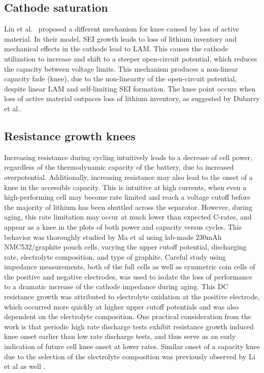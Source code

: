 \documentclass[journal=jpcl, manuscript=article, layout=onecolumn]{achemso}
\newcommand{\pbox}[1]{{
\fbox{
\parbox{0.8\textwidth}{  \fbox{$\triangleright$\textcolor{blue}{\textbf{From Peter}:}} 
#1
}}}}
\begin{document}
\subsection{Cathode saturation}

\pbox{Tino: Let's work on this section together}

Lin et al.~\cite{lin_comprehensive_2013} proposed a different mechanism for knee caused by loss of active material. In their model, SEI growth leads to loss of lithium inventory and mechanical effects in the cathode lead to LAM. This causes the cathode utilization to increase and shift to a steeper open-circuit potential, which reduces the capacity between voltage limits. This mechanism produces a non-linear capacity fade (knee), due to the non-linearity of the open-circuit potential, despite linear LAM and self-limiting SEI formation. The knee point occurs when loss of active material outpaces loss of lithium inventory, as suggested by Dubarry et al.\cite{dubarry_durability_2018}.

\subsection{Resistance growth knees}

Increasing resistance during cycling intuitively leads to a decrease of cell power, regardless of the thermodynamic capacity of the battery, due to increased overpotential. Additionally, increasing resistance may also lead to the onset of a knee in the accessible capacity. This is intuitive at high currents, when even a high-performing cell may become rate limited and reach a voltage cutoff before the majority of lithium has been shuttled across the separator. However, during aging, this rate limitation may occur at much lower than expected C-rates, and appear as a knee in the plots of both power and capacity versus cycles. This behavior was thoroughly studied by Ma et al \cite{ma_editors_2019} using lab-made 230mAh NMC532/graphite pouch cells, varying the upper cutoff potential, discharging rate, electrolyte composition, and type of graphite. Careful study using impedance measurements, both of the full cells as well as symmetric coin cells of the positive and negative electrodes, was used to isolate the loss of performance to a dramatic increase of the cathode impedance during aging. This DC resistance growth was attributed to electrolyte oxidation at the positive electrode, which occurred more quickly at higher upper cutoff potentials and was also dependent on the electrolyte composition. One practical consideration from the work is that periodic high rate discharge tests exhibit resistance growth induced knee onset earlier than low rate discharge tests, and thus serve as an early indication of future cell knee onset at lower rates. Similar onset of a capacity knee due to the selection of the electrolyte composition was previously observed by Li et al as well \cite{li_methyl_2018}. 
\end{document}
